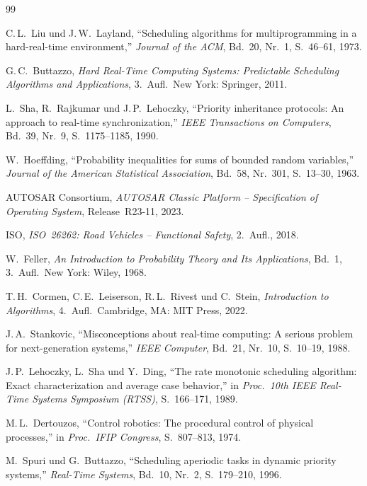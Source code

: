 ﻿\documentclass[a4paper,12pt]{article}
\theoremstyle{definition}
\begin{document}
	\begin{thebibliography}{99}
		
		C.\,L.\ Liu und J.\,W.\ Layland,
		``Scheduling algorithms for multiprogramming in a hard-real-time environment,''
		\textit{Journal of the ACM}, Bd.~20, Nr.~1, S.~46--61, 1973.
		
		G.\,C.\ Buttazzo,
		\textit{Hard Real-Time Computing Systems: Predictable Scheduling Algorithms and Applications},
		3.~Aufl.\ New York: Springer, 2011.
		
		L.\ Sha, R.\ Rajkumar und J.\,P.\ Lehoczky,
		``Priority inheritance protocols: An approach to real-time synchronization,''
		\textit{IEEE Transactions on Computers}, Bd.~39, Nr.~9, S.~1175--1185, 1990.
		
		W.\ Hoeffding,
		``Probability inequalities for sums of bounded random variables,''
		\textit{Journal of the American Statistical Association}, Bd.~58, Nr.~301, S.~13--30, 1963.
		
		AUTOSAR Consortium,
		\textit{AUTOSAR Classic Platform -- Specification of Operating System},
		Release~R23-11, 2023.
		
		ISO,
		\textit{ISO~26262: Road Vehicles -- Functional Safety},
		2.~Aufl., 2018.
		
		W.\ Feller,
		\textit{An Introduction to Probability Theory and Its Applications},
		Bd.~1, 3.~Aufl.\ New York: Wiley, 1968.
		
		T.\,H.\ Cormen, C.\,E.\ Leiserson, R.\,L.\ Rivest und C.\ Stein,
		\textit{Introduction to Algorithms},
		4.~Aufl.\ Cambridge, MA: MIT Press, 2022.

		J.\,A.\ Stankovic,
		``Misconceptions about real-time computing: A serious problem for next-generation systems,''
		\textit{IEEE Computer}, Bd.~21, Nr.~10, S.~10--19, 1988.

		J.\,P.\ Lehoczky, L.\ Sha und Y.\ Ding,
		``The rate monotonic scheduling algorithm: Exact characterization and average case behavior,''
		in \textit{Proc.\ 10th IEEE Real-Time Systems Symposium (RTSS)}, S.~166--171, 1989.

		M.\,L.\ Dertouzos,
		``Control robotics: The procedural control of physical processes,''
		in \textit{Proc.\ IFIP Congress}, S.~807--813, 1974.

		M.\ Spuri und G.\ Buttazzo,
		``Scheduling aperiodic tasks in dynamic priority systems,''
		\textit{Real-Time Systems}, Bd.~10, Nr.~2, S.~179--210, 1996.


\end{thebibliography}
\end{document}
